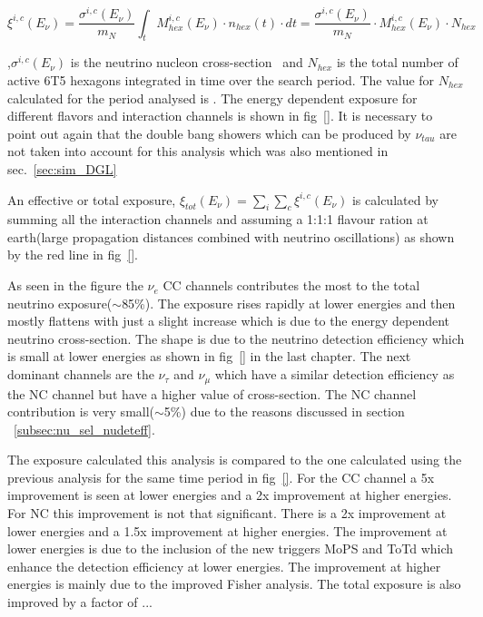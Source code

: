 \begin{equation}
  \xi^{i,c}(E_{\nu}) = \frac{\sigma^{i,c}(E_{\nu})}{m_N} \int_{t} M_{hex}^{i,c}(E_{\nu}) \cdot n_{hex}(t) \cdot dt =  \frac{\sigma^{i,c}(E_{\nu})}{m_N} \cdot M_{hex}^{i,c}(E_{\nu}) \cdot N_{hex}
\end{equation}

,$\sigma^{i,c}(E_{\nu})$ is the neutrino nucleon cross-section~\cite{Cooper-Sarkar:2011jtt} and $N_{hex}$ is the total number of active 6T5 hexagons integrated in time over the search period. The value for $N_{hex}$ calculated for the period analysed is . The energy dependent exposure for different flavors and interaction channels is shown in fig~\ref{}. It is necessary to point out again that the double bang showers which can be produced by $\nu_{tau}$ are not taken into account for this analysis which was also mentioned in sec.~\ref{sec:sim_DGL} 

An effective or total exposure, $\xi_{tot}(E_{\nu}) = \sum_{i}\sum_{c} \xi^{i,c}(E_{\nu})$ is calculated by summing all the interaction channels and assuming a 1:1:1 flavour ration at earth(large propagation distances combined with neutrino oscillations) as shown by the red line in fig~\ref{}. 

As seen in the figure the $\nu_e$ CC channels contributes the most to the total neutrino exposure($\sim$85\%). The exposure rises rapidly at lower energies and then mostly flattens with just a slight increase which is due to the energy dependent neutrino cross-section. The shape is due to the neutrino detection efficiency which is small at lower energies as shown in fig~\ref{} in the last chapter. The next dominant channels are the $\nu_{\tau}$ and $\nu_{\mu}$ which have a similar detection efficiency as the NC channel but have a higher value of cross-section. The NC channel contribution is very small($\sim$5\%) due to the reasons discussed in section ~\ref{subsec:nu_sel_nudeteff}.  

The exposure calculated this analysis is compared to the one calculated using the previous analysis for the same time period in fig~\ref{}. For the CC channel a 5x improvement is seen at lower energies and a 2x improvement at higher energies. For NC this improvement is not that significant. There is a 2x improvement at lower energies and a 1.5x improvement at higher energies. The improvement at lower energies is due to the inclusion of the new triggers MoPS and ToTd which enhance the detection efficiency at lower energies. The improvement at higher energies is mainly due to the improved Fisher analysis. The total exposure is also improved by a factor of ... 
